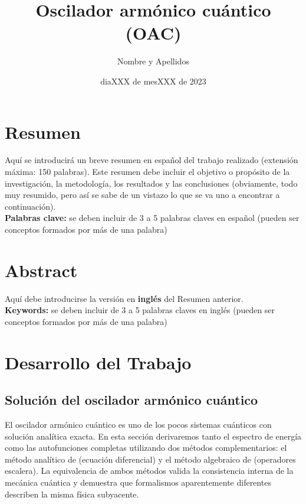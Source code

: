 \documentclass[11pt,a4paper,spanish]{book}
\title{Oscilador armónico cuántico (OAC)}
\author{Nombre y Apellidos}
\date{diaXXX de mesXXX de 2023}
\begin{document}
	\renewcommand{\listfigurename}{Índice de figuras}
	\renewcommand{\listtablename}{Índice de tablas}
	\renewcommand{\contentsname}{Índice de contenidos}
	\renewcommand{\figurename}{Figura}
	\renewcommand{\tablename}{Tabla} 
	
	\maketitle
	
	\frontmatter
	\tableofcontents
	\listoffigures %
	\listoftables %
	
	\chapter{Resumen}
	Aquí se introducirá un breve resumen en español del trabajo realizado (extensión máxima: 150 palabras). Este resumen debe incluir el objetivo o propósito de la investigación, la metodología, los resultados y las conclusiones (obviamente, todo muy resumido, pero así se sabe de un vistazo lo que se va uno a encontrar a continuación).\\
	
	
	{\bf Palabras clave:} se deben incluir de 3 a 5 palabras claves en español (pueden ser conceptos formados por más de una palabra)
	
	\chapter{Abstract}
	Aquí debe introducirse la versión en {\bf inglés} del Resumen anterior.\\
	
	
	{\bf Keywords:} se deben incluir de 3 a 5 palabras claves en inglés  (pueden ser conceptos formados por más de una palabra)
	
	
	
	
	\mainmatter
	
	
	
	\chapter{Desarrollo del Trabajo}
	
	\section{Solución del oscilador armónico cuántico}
	
	El oscilador armónico cuántico es uno de los pocos sistemas cuánticos con solución analítica exacta. En esta sección derivaremos tanto el espectro de energía como las autofunciones completas utilizando dos métodos complementarios: el método analítico de \cite{schrodinger1926b} (ecuación diferencial)  y el método algebraico de \cite{dirac1930} (operadores escalera). La equivalencia de ambos métodos valida la consistencia interna de la mecánica cuántica y demuestra que formalismos aparentemente diferentes describen la misma física subyacente.
	
\end{document}
